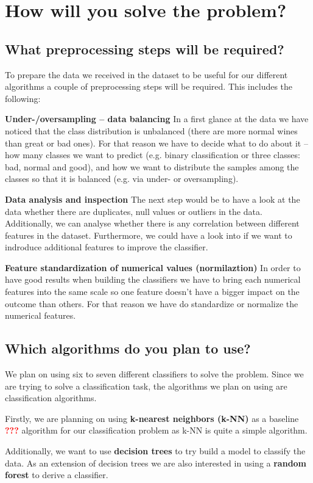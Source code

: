 \documentclass[11pt,titlepage,oneside,openany]{book}
\begin{document}
\chapter{How will you solve the problem?}
\section{What preprocessing steps will be required?}
To prepare the data we received in the dataset to be useful for our different algorithms a couple of preprocessing
steps will be required. This includes the following:

\textbf{Under-/oversampling -- data balancing} In a first glance at the data we have noticed that the class distribution is
unbalanced (there are more normal wines than great or bad ones). For that reason we have to decide what to do about 
it -- how many classes we want to predict (e.g. binary classification or three classes: bad, normal and good), and how we want to distribute the samples
among the classes so that it is balanced (e.g. via under- or oversampling).

\textbf{Data analysis and inspection} The next step would be to have a look at the data whether there are duplicates, null values
or outliers in the data. Additionally, we can analyse whether there is any correlation between different features in the dataset. 
Furthermore, we could have a look into if we want to indroduce additional features to improve the classifier.

\textbf{Feature standardization of numerical values (normilaztion)} In order to have good results when building the classifiers
we have to bring each numerical features into the same scale so one feature doesn't have a bigger impact on the outcome than
others. For that reason we have do standardize or normalize the numerical features.

\section{Which algorithms do you plan to use?}
We plan on using six to seven different classifiers to solve the problem. Since we 
are trying to solve a classification task, the algorithms we plan on using are classification
algorithms.

Firstly, we are planning on using \textbf{k-nearest neighbors (k-NN)} as a baseline \textcolor{red}{\textbf{???}}
algorithm for our classification problem as k-NN is quite a simple algorithm.

Additionally, we want to use \textbf{decision trees} to try build a model to classify the
data. As an extension of decision trees we are also interested in using a \textbf{random forest}
to derive a classifier.
\end{document}
